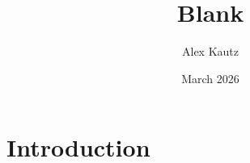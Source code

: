 \documentclass{article}
\title{Blank}
\author{Alex Kautz}
\date{March 2026}
\begin{document}
\maketitle

\section{Introduction}
\end{document}
